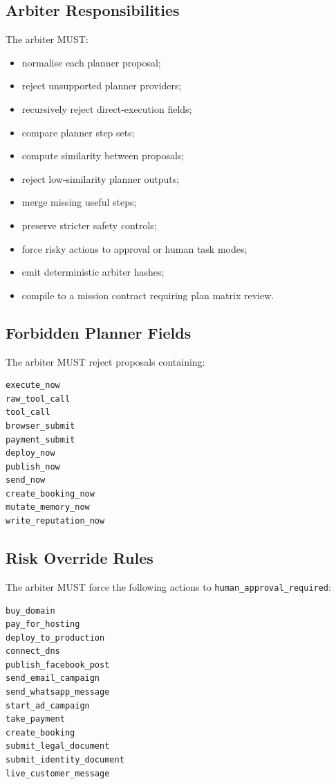 \subsection{Arbiter Responsibilities}

The arbiter MUST:

\begin{itemize}
  \item normalise each planner proposal;
  \item reject unsupported planner providers;
  \item recursively reject direct-execution fields;
  \item compare planner step sets;
  \item compute similarity between proposals;
  \item reject low-similarity planner outputs;
  \item merge missing useful steps;
  \item preserve stricter safety controls;
  \item force risky actions to approval or human task modes;
  \item emit deterministic arbiter hashes;
  \item compile to a mission contract requiring plan matrix review.
\end{itemize}

\subsection{Forbidden Planner Fields}

The arbiter MUST reject proposals containing:

\begin{verbatim}
execute_now
raw_tool_call
tool_call
browser_submit
payment_submit
deploy_now
publish_now
send_now
create_booking_now
mutate_memory_now
write_reputation_now
\end{verbatim}

\subsection{Risk Override Rules}

The arbiter MUST force the following actions to \texttt{human\_approval\_required}:

\begin{verbatim}
buy_domain
pay_for_hosting
deploy_to_production
connect_dns
publish_facebook_post
send_email_campaign
send_whatsapp_message
start_ad_campaign
take_payment
create_booking
submit_legal_document
submit_identity_document
live_customer_message
\end{verbatim}

